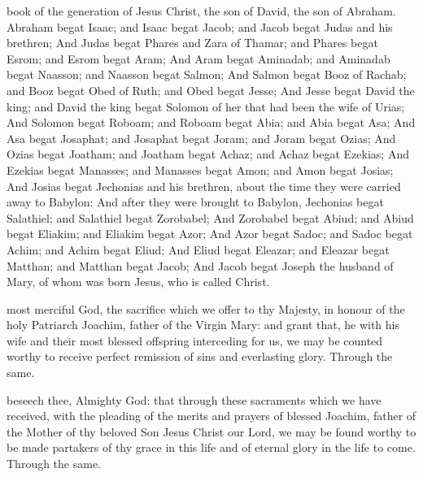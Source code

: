 
 book of the generation of Jesus Christ, the son of David, the son of Abraham. Abraham begat Isaac; and Isaac begat Jacob; and Jacob begat Judas and his brethren; And Judas begat Phares and Zara of Thamar; and Phares begat Esrom; and Esrom begat Aram; And Aram begat Aminadab; and Aminadab begat Naasson; and Naasson begat Salmon; And Salmon begat Booz of Rachab; and Booz begat Obed of Ruth; and Obed begat Jesse; And Jesse begat David the king; and David the king begat Solomon of her that had been the wife of Urias; And Solomon begat Roboam; and Roboam begat Abia; and Abia begat Asa; And Asa begat Josaphat; and Josaphat begat Joram; and Joram begat Ozias; And Ozias begat Joatham; and Joatham begat Achaz; and Achaz begat Ezekias; And Ezekias begat Manasses; and Manasses begat Amon; and Amon begat Josias; And Josias begat Jechonias and his brethren, about the time they were carried away to Babylon: And after they were brought to Babylon, Jechonias begat Salathiel; and Salathiel begat Zorobabel; And Zorobabel begat Abiud; and Abiud begat Eliakim; and Eliakim begat Azor; And Azor begat Sadoc; and Sadoc begat Achim; and Achim begat Eliud; And Eliud begat Eleazar; and Eleazar begat Matthan; and Matthan begat Jacob; And Jacob begat Joseph the husband of Mary, of whom was born Jesus, who is called Christ.


\secret
{} most merciful God, the sacrifice which we offer to thy Majesty, in honour of the holy Patriarch Joachim, father of the Virgin Mary: and grant that, he with his wife and their most blessed offspring interceding for us, we may be counted worthy to receive perfect remission of sins and everlasting glory. Through the same.


\postcommunion
{} beseech thee, Almighty God: that through these sacraments which we have received, with the pleading of the merits and prayers of blessed Joachim, father of the Mother of thy beloved Son Jesus Christ our Lord, we may be found worthy to be made partakers of thy grace in this life and of eternal glory in the life to come. Through the same.


